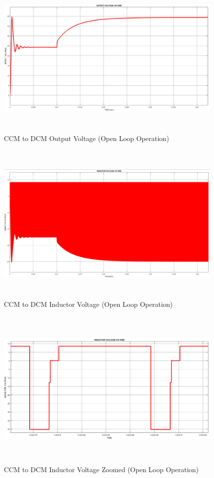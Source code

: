 \documentclass[oneside,12pt]{article}
\begin{document}
\begin{figure}[H]
	\centering
	\includegraphics[width=14cm, height=8cm]{Q4/yeni/VOUT}
	\caption{CCM to DCM Output Voltage (Open Loop Operation)}
	\label{fig:vout}
\end{figure}
\begin{figure}[H]
	\centering
	\includegraphics[width=14cm, height=8cm]{Q4/yeni/VL}
	\caption{CCM to DCM Inductor Voltage (Open Loop Operation)}
	\label{fig:vl}
\end{figure}
\begin{figure}[H]
	\centering
	\includegraphics[width=14cm, height=8cm]{Q4/yeni/VLzoom}
	\caption{CCM to DCM Inductor Voltage Zoomed (Open Loop Operation)}
	\label{fig:vlzoom}
\end{figure}
\end{document}
